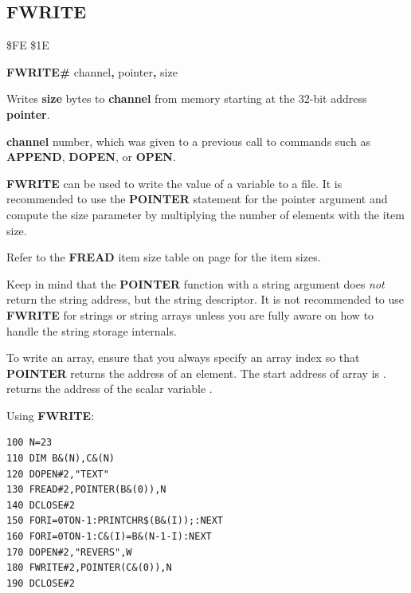 \subsection{FWRITE}
\begin{description}[leftmargin=2cm,style=nextline]
\item [Token:] \$FE \$1E
\item [Format:] {\bf FWRITE\#} channel{\bf,} pointer{\bf,} size
\item [Usage:] Writes {\bf size} bytes to {\bf channel} from memory
               starting at the 32-bit address {\bf pointer}.

               {\bf channel} number, which was given to a previous
               call to commands such as {\bf APPEND}, {\bf DOPEN}, or {\bf OPEN}.

               {\bf FWRITE} can be used to write the value of a variable to a file.
               It is recommended to use the {\bf POINTER} statement
               for the pointer argument and compute the size parameter
               by multiplying the number of elements with the item size.

               Refer to the {\bf FREAD} item size table on page \pageref{freadtable}
               for the item sizes.

Keep in mind that the {\bf POINTER} function with a string argument
does {\em not} return the string address, but the string descriptor.
It is not recommended to use {\bf FWRITE} for strings or string arrays
unless you are fully aware on how to handle the string storage internals.

To write an array, ensure that you always specify an array index so that {\bf
POINTER} returns the address of an element. The start address of array
 is . 
returns the address of the scalar variable .

\item [Example:] Using {\bf FWRITE}:
\begin{tcolorbox}[colback=black,coltext=white]
\verbatimfont{\codefont}
\begin{verbatim}
100 N=23
110 DIM B&(N),C&(N)
120 DOPEN#2,"TEXT"
130 FREAD#2,POINTER(B&(0)),N
140 DCLOSE#2
150 FORI=0TON-1:PRINTCHR$(B&(I));:NEXT
160 FORI=0TON-1:C&(I)=B&(N-1-I):NEXT
170 DOPEN#2,"REVERS",W
180 FWRITE#2,POINTER(C&(0)),N
190 DCLOSE#2
\end{verbatim}
\end{tcolorbox}
\end{description}

